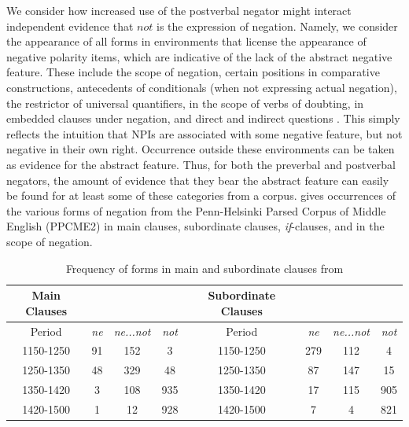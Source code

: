 We consider how increased use of the postverbal negator might interact independent evidence that $not$ is the expression of negation. Namely, we consider the appearance of all forms in environments that license the appearance of negative polarity items, which are indicative of the lack of the abstract negative feature. These include the scope of negation, certain positions in comparative constructions, antecedents of conditionals (when not expressing actual negation), the restrictor of universal quantifiers, in the scope of verbs of doubting, in embedded clauses under negation, and direct and indirect questions \citep{ladusaw1979, giannakidou1998}. This simply reflects the intuition that NPIs are associated with some negative feature, but not negative in their own right. Occurrence outside these environments can be taken as evidence for the abstract feature. Thus, for both the preverbal and postverbal negators, the amount of evidence that they bear the abstract feature can easily be found for at least some 
of these categories from a corpus. \cite{wallage2008} gives occurrences of the various forms of negation from the Penn-Helsinki Parsed Corpus of Middle English (PPCME2) \citep{ppcme2}  in main clauses, subordinate clauses, \emph{if}-clauses, and in the scope of negation.

\begin{table}[ht]
\begin{center}
\begin{tabular}{@{}cccccccc@{}}
\hline
Main Clauses & & & &Subordinate Clauses &  &   &\\
\hline
Period & \emph{ne} & \emph{ne...not} & \emph{not} & Period & \emph{ne} & \emph{ne...not} & \emph{not}\\
\hline
1150-1250 & 91 & 152 & 3  & 1150-1250 & 279 & 112 & 4  \\
1250-1350 & 48 & 329 & 48  & 1250-1350 & 87 & 147 & 15  \\
1350-1420 & 3 & 108 & 935  & 1350-1420 & 17 & 115 & 905  \\
1420-1500 & 1 & 12 & 928  & 1420-1500 & 7 & 4 & 821  \\
\hline
\end{tabular}
  \caption{Frequency of forms in main and subordinate clauses from}
\end{center}
\end{table}

